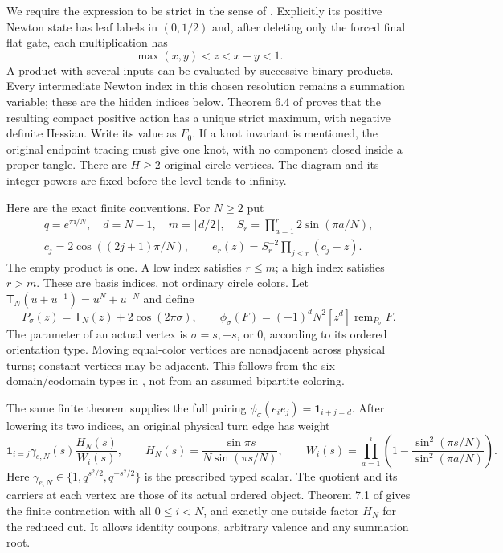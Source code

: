 \documentclass[11pt]{article}
\numberwithin{equation}{section}
\theoremstyle{definition}\newtheorem{definition}[theorem]{Definition}
\newcommand{\ii}{\mathrm i}
\newcommand{\rem}{\operatorname{rem}}
\begin{document}
We require the expression to be strict in the sense of
\cite[Lemma 5.2 and Theorem 5.5]{Newton}. Explicitly its positive
Newton state has leaf labels in $(0,1/2)$ and, after deleting only the
forced final flat gate, each multiplication has
\[
 \max(x,y)<z<x+y<1.
\]
A product with several inputs can be evaluated by successive binary
products. Every intermediate Newton index in this chosen resolution
remains a summation variable; these are the hidden indices below.
Theorem 6.4 of \cite{Newton} proves that the resulting compact
positive action has a unique strict maximum, with negative definite
Hessian. Write its value as $F_0$. If a knot invariant is mentioned,
the original endpoint tracing must give one knot, with no component
closed inside a proper tangle. There are $H\ge2$ original circle
vertices. The diagram and its integer powers are fixed before the
level tends to infinity.

Here are the exact finite conventions. For $N\ge2$ put
\begin{equation}\label{ms:finite-data}
\begin{gathered}
 q=e^{\pi\ii/N},\quad d=N-1,\quad m=\lfloor d/2\rfloor,
 \quad S_r=\prod_{a=1}^r2\sin(\pi a/N),\\
 c_j=2\cos((2j+1)\pi/N),\qquad
 e_r(z)=S_r^{-2}\prod_{j<r}(c_j-z).
\end{gathered}
\end{equation}
The empty product is one. A low index satisfies $r\le m$; a high
index satisfies $r>m$. These are basis indices, not ordinary circle
colors. Let $\mathsf T_N(u+u^{-1})=u^N+u^{-N}$ and define
\begin{equation}\label{ms:quotient}
 P_\sigma(z)=\mathsf T_N(z)+2\cos(2\pi\sigma),\qquad
 \phi_\sigma(F)=(-1)^dN^2[z^d]\rem_{P_\sigma}F.
\end{equation}
The parameter of an actual vertex is $\sigma=s,-s$, or $0$, according
to its ordered orientation type. Moving equal-color vertices are
nonadjacent across physical turns; constant vertices may be adjacent.
This follows from the six domain/codomain types in
\cite[Theorem 1.1]{Meridian}, not from an assumed bipartite coloring.

The same finite theorem supplies the full pairing
$\phi_\sigma(e_i e_j)=\mathbf1_{i+j=d}$. After lowering its two
indices, an original physical turn edge has weight
\begin{equation}\label{ms:edge}
 \mathbf1_{i=j}\gamma_{e,N}(s)\frac{H_N(s)}{W_i(s)},\qquad
 H_N(s)=\frac{\sin\pi s}{N\sin(\pi s/N)},\qquad
 W_i(s)=\prod_{a=1}^i
 \left(1-\frac{\sin^2(\pi s/N)}{\sin^2(\pi a/N)}\right).
\end{equation}
Here $\gamma_{e,N}\in\{1,q^{s^2/2},q^{-s^2/2}\}$ is the prescribed
typed scalar. The quotient and its carriers at each vertex are those
of its actual ordered object. Theorem 7.1 of \cite{Meridian} gives
the finite contraction with all $0\le i<N$, and exactly one outside
factor $H_N$ for the reduced cut. It allows identity coupons, arbitrary
valence and any summation root.
\end{document}

